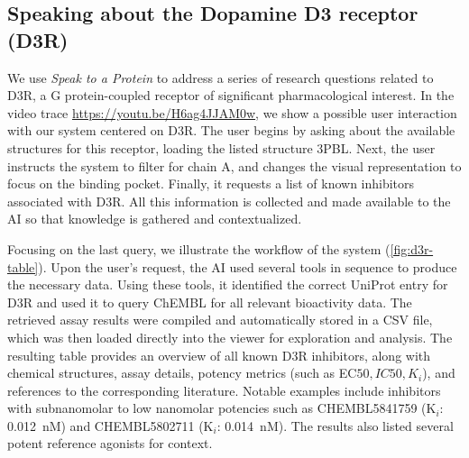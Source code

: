 \documentclass{article}
\begin{document}

\subsection{Speaking about the Dopamine D3 receptor (D3R)}
We use \emph{Speak to a Protein} to address a series of research questions related to D3R,  a G protein-coupled receptor of significant pharmacological interest.
In the video trace \url{https://youtu.be/H6ag4JJAM0w}, we show a possible user interaction with our system centered on D3R. The user begins by asking about the available structures for this receptor, loading the listed structure 3PBL. Next, the user instructs the system to filter for chain A, and changes the visual representation to focus on the binding pocket. Finally, it requests a list of known inhibitors associated with D3R. All this information is collected and made available to the AI so that knowledge is gathered and contextualized.

Focusing on the last query, we illustrate the workflow of the system (\cref{fig:d3r-table}). Upon the user's request, the AI used several tools in sequence to produce the necessary data. Using these tools, it identified the correct UniProt entry for D3R and used it to query ChEMBL for all relevant bioactivity data. The retrieved assay results were compiled and automatically stored in a CSV file, which was then loaded directly into the viewer for exploration and analysis.
The resulting table provides an overview of all known D3R inhibitors, along with chemical structures, assay details, potency metrics (such as EC${50},IC{50},K_i$), and references to the corresponding literature. Notable examples include inhibitors with subnanomolar to low nanomolar potencies such as CHEMBL5841759 (K$_i$: 0.012~nM) and CHEMBL5802711 (K$_i$: 0.014~nM). The results also listed several potent reference agonists for context.
\end{document}
